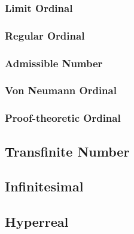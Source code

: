 \subsubsection{Limit Ordinal}\label{sec:limit_ordinal}

\subsubsection{Regular Ordinal}\label{sec:regular_ordinal}

\subsubsection{Admissible Number}\label{sec:admissible_ordinal}

\subsubsection{Von Neumann Ordinal}\label{sec:vonneumann_ordinal}

\subsubsection{Proof-theoretic Ordinal}\label{sec:proof_ordinal}



\subsection{Transfinite Number}\label{sec:transfinite_number}

\subsection{Infinitesimal}\label{sec:infinitesimal}

\subsection{Hyperreal}\label{sec:hyperreal}

